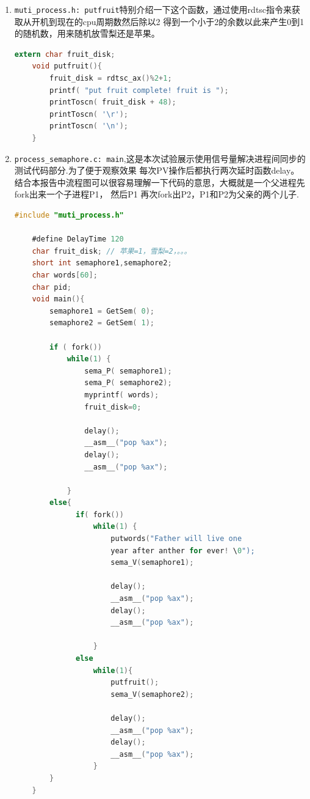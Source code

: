 \documentclass[a4paper]{article}
\begin{document}
{\begin{enumerate}
{\begin{lstlisting}[language={C}]
		sema_array[ s_index].tail = 0;
		__asm__("mov %bp,%sp");
		__asm__("pop %bx");
		__asm__("pop %bx");
		__asm__("pop %bx");
		__asm__("jmp *%bx");  //back to os_syscall callrun
	}
 	\end{lstlisting}}
	\item \verb|muti_process.h: putfruit|特别介绍一下这个函数，通过使用rdtsc指令来获取从开机到现在的cpu周期数然后除以2
	得到一个小于2的余数以此来产生0到1的随机数，用来随机放雪梨还是苹果。
	{\scriptsize\begin{lstlisting}[language={C}]
	extern char fruit_disk;
	void putfruit(){
		fruit_disk = rdtsc_ax()%2+1;
		printf( "put fruit complete! fruit is ");
		printToscn( fruit_disk + 48);
		printToscn( '\r');
		printToscn( '\n');
	}
 	\end{lstlisting}}
	\item \verb|process_semaphore.c: main|,这是本次试验展示使用信号量解决进程间同步的测试代码部分.为了便于观察效果
	每次PV操作后都执行两次延时函数delay。结合本报告中流程图可以很容易理解一下代码的意思，大概就是一个父进程先fork出来一个子进程P1，
	然后P1 再次fork出P2，P1和P2为父亲的两个儿子.
	{\scriptsize\begin{lstlisting}[language={C}]
	#include "muti_process.h"

	#define DelayTime 120
	char fruit_disk; // 苹果=1，雪梨=2，。。。
	short int semaphore1,semaphore2;
	char words[60];
	char pid;
	void main(){
	    semaphore1 = GetSem( 0);
	    semaphore2 = GetSem( 1);

	    if ( fork())
			while(1) {
				sema_P( semaphore1);
				sema_P( semaphore2);
				myprintf( words);
				fruit_disk=0;

				delay();
				__asm__("pop %ax");
				delay();
				__asm__("pop %ax");

			}
		else{
			  if( fork())
				  while(1) {
					  putwords("Father will live one 
					  year after anther for ever! \0");
					  sema_V(semaphore1);

					  delay();
					  __asm__("pop %ax");
					  delay();
					  __asm__("pop %ax");

				  }
			  else
				  while(1){
					  putfruit();
					  sema_V(semaphore2);

					  delay();
					  __asm__("pop %ax");
					  delay();
					  __asm__("pop %ax");
				  }
		}
	}
 	\end{lstlisting}}

 \end{enumerate}
}
\end{document}
